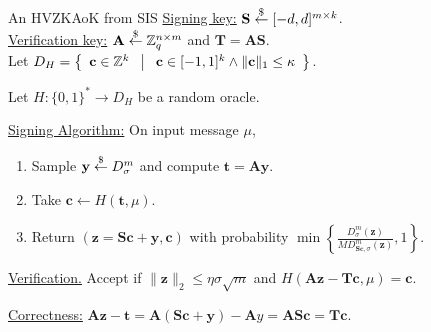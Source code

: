 \begin{frame}{An HVZKAoK from SIS}
	\underline{Signing key:} $\mathbf{S} \stackrel{\$}{\leftarrow} [-d, d]^{m\times k}$.\\
	
	\underline{Verification key:} $\mathbf{A} \stackrel{\$}{\leftarrow} \mathbb{Z}_q^{n \times m}$ and $\mathbf{T} = \mathbf{A}\mathbf{S}$.\\
	
	Let $D_H = \left\{ \begin{array}{c} \mathbf{c} \in \mathbb{Z}^k \end{array}\;\middle|\;\begin{array}{c} \mathbf{c} \in [-1, 1]^k \wedge \lVert\mathbf{c}\rVert_1 \leq \kappa \end{array} \right\}$.
	
	Let $H:\{0,1\}^*\to D_H$ be a random oracle.
	
	\underline{Signing Algorithm:} On input message $\mu$,
	\begin{enumerate}
		\item Sample $\mathbf{y} \stackrel{\$}{\leftarrow} D^m_\sigma$ and compute $\mathbf{t} = \mathbf{A}\mathbf{y}$.
		\item Take $\mathbf{c} \leftarrow H(\mathbf{t}, \mu)$.
		\item Return $(\mathbf{z} = \mathbf{S}\mathbf{c} + \mathbf{y}, \mathbf{c})$ with probability $\min\left\{\frac{D^m_\sigma(\mathbf{z})}{MD^m_{\mathbf{S}\mathbf{c},\sigma}(\mathbf{z})},1\right\}$.
	\end{enumerate}

	\underline{Verification.} Accept if $\lVert\mathbf{z}\rVert_2 \leq \eta\sigma\sqrt{m}$ and $H(\mathbf{A}\mathbf{z}- \mathbf{T}\mathbf{c}, \mu) = \mathbf{c}$.

	\underline{Correctness:} $\mathbf{A}\mathbf{z} - \mathbf{t} = \mathbf{A}(\mathbf{S}\mathbf{c}+\mathbf{y}) - \mathbf{A}{y} = \mathbf{A}\mathbf{S}\mathbf{c} = \mathbf{T}\mathbf{c}$.
\end{frame}

